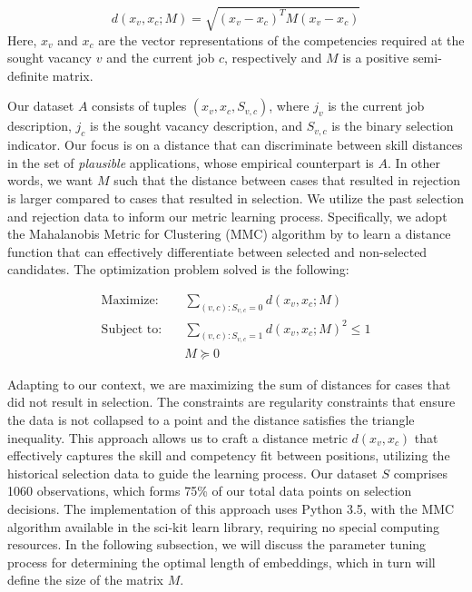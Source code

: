\begin{equation}
d(x_v, x_c; M) = \sqrt{(x_v - x_c)^T M (x_v - x_c)}
\end{equation}
Here, \(x_v\) and \(x_c\) are the vector representations of the competencies required at the sought vacancy \(v\) and 
the current job \(c\), respectively and $M$ is a positive semi-definite matrix.

Our dataset \(A\) consists of tuples \((x_v, x_c, S_{v,c})\), where \(j_v\) is the current job description, \(j_c\) is 
the sought vacancy description, and \(S_{v,c}\) is the binary selection indicator. Our focus is on a distance that can 
discriminate between skill distances in the set of \textit{plausible} applications, whose empirical counterpart is \(A\). 
In other words, we want \(M\) such that the distance between cases that resulted in rejection is larger compared to cases 
that resulted in selection. We utilize the past selection and rejection data to inform our metric learning process. 
Specifically, we adopt the Mahalanobis Metric for Clustering (MMC) algorithm by \citep{Xing2002} to learn a distance 
function that can effectively differentiate between selected and non-selected candidates. The optimization problem solved 
is the following: 

\begin{align*}
\text{Maximize:} \quad & \sum_{(v,c): S_{v,c} = 0} d(x_v, x_c; M) \\[1em]
\text{Subject to:} \quad & \sum_{(v,c): S_{v,c} = 1} d(x_v, x_c; M)^2 \leq 1 \\
& M \succeq 0
\end{align*}


Adapting to our context, we are maximizing the sum of distances for cases that did not result in selection. The constraints 
are regularity constraints that ensure the data is not collapsed to a point and the distance satisfies the triangle 
inequality. This approach allows us to craft a distance metric \(d(x_v, x_c)\) that effectively captures the skill and 
competency fit between positions, utilizing the historical selection data to guide the learning process. Our dataset \(S\) 
comprises 1060 observations, which forms 75\% of our total data points on selection decisions. The implementation of this 
approach uses Python 3.5, with the MMC algorithm available in the sci-kit learn library, requiring no special computing 
resources. In the following subsection, we will discuss the parameter tuning process for determining the optimal length of 
embeddings, which in turn will define the size of the matrix \(M\).




